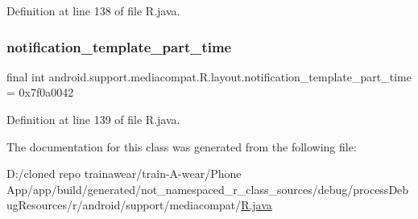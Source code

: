 Definition at line 138 of file R.\+java.

\mbox{\label{classandroid_1_1support_1_1mediacompat_1_1_r_1_1layout_ac483500984025c7db556bf3c6d4cfc49}} 
\subsubsection{\texorpdfstring{notification\_template\_part\_time}{notification\_template\_part\_time}}
{\footnotesize\ttfamily final int android.\+support.\+mediacompat.\+R.\+layout.\+notification\+\_\+template\+\_\+part\+\_\+time = 0x7f0a0042\hspace{0.3cm}{\ttfamily [static]}}



Definition at line 139 of file R.\+java.



The documentation for this class was generated from the following file\+:\begin{DoxyCompactItemize}
\item 
D\+:/cloned repo trainawear/train-\/\+A-\/wear/\+Phone App/app/build/generated/not\+\_\+namespaced\+\_\+r\+\_\+class\+\_\+sources/debug/process\+Debug\+Resources/r/android/support/mediacompat/\mbox{\hyperlink{process_debug_resources_2r_2android_2support_2mediacompat_2_r_8java}{R.\+java}}\end{DoxyCompactItemize}
